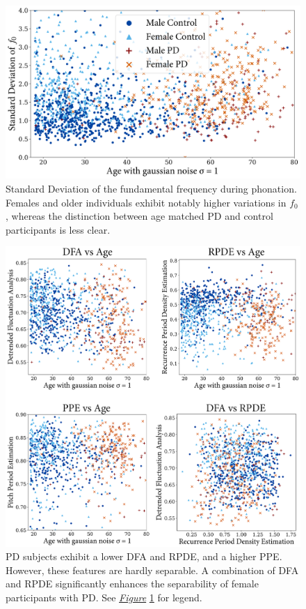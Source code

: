 \documentclass[12pt, twoside]{book}
\begin{document}
\begin{figure}[!htb]
	\centering\includegraphics[width=0.67\linewidth]{f0stdev.png}
	\caption{Standard Deviation of the fundamental frequency during phonation. Females and older individuals exhibit notably higher variations in $f_0$, whereas the distinction between age matched PD and control participants is less clear.}
	\label{stdevf0}
\end{figure}

\begin{figure}[!htb]
	\centering\centerline{\includegraphics[width=0.82\linewidth]{dfapperpde.png}}
	\caption{PD subjects exhibit a lower DFA and RPDE, and a higher PPE. However, these features are hardly separable. A combination of DFA and RPDE significantly enhances the separability of female participants with PD. See \textit{\hyperref[stdevf0]{Figure}} \ref{stdevf0} for legend.}
	\label{dfapperpde}
	\vspace{-1.5em}
\end{figure}
\end{document}
